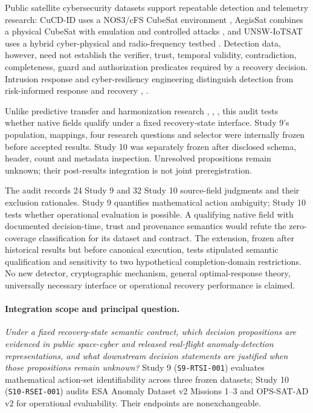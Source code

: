 \documentclass[preprint,12pt]{elsarticle}
\begin{document}
Public satellite cybersecurity datasets support repeatable detection and telemetry research: CuCD-ID uses a NOS3/cFS CubeSat environment \cite{fayyaz2026cucd}, AegisSat combines a physical CubeSat with emulation and controlled attacks \cite{idan2025aegissat}, and UNSW-IoTSAT uses a hybrid cyber-physical and radio-frequency testbed \cite{abdelhameed2026unsw}. Detection data, however, need not establish the verifier, trust, temporal validity, contradiction, completeness, guard and authorization predicates required by a recovery decision. Intrusion response and cyber-resiliency engineering distinguish detection from risk-informed response and recovery \cite{bashendy2023irs}, \cite{ross2021cyberresilient}.

Unlike predictive transfer and harmonization research \cite{koh2021wilds}, \cite{cerasuolo2026transfer}, \cite{rodriguez2026harmonization}, this audit tests whether native fields qualify under a fixed recovery-state interface. Study 9's population, mappings, four research questions and selector were internally frozen before accepted results. Study 10 was separately frozen after disclosed schema, header, count and metadata inspection. Unresolved propositions remain unknown; their post-results integration is not joint preregistration.

The audit records 24 Study 9 and 32 Study 10 source-field judgments and their exclusion rationales. Study 9 quantifies mathematical action ambiguity; Study 10 tests whether operational evaluation is possible. A qualifying native field with documented decision-time, trust and provenance semantics would refute the zero-coverage classification for its dataset and contract. The extension, frozen after historical results but before canonical execution, tests stipulated semantic qualification and sensitivity to two hypothetical completion-domain restrictions. No new detector, cryptographic mechanism, general optimal-response theory, universally necessary interface or operational recovery performance is claimed.

\paragraph{Integration scope and principal question.}
\emph{Under a fixed recovery-state semantic contract, which decision propositions are evidenced in public space-cyber and released real-flight anomaly-detection representations, and what downstream decision statements are justified when those propositions remain unknown?} Study 9 (\texttt{S9-RTSI-001}) evaluates mathematical action-set identifiability across three frozen datasets; Study 10 (\texttt{S10-RSEI-001}) audits ESA Anomaly Dataset v2 Missions 1--3 \cite{esaad2025v2} and OPS-SAT-AD v2 \cite{opssat2024v2} for operational evaluability. Their endpoints are nonexchangeable.
\end{document}
